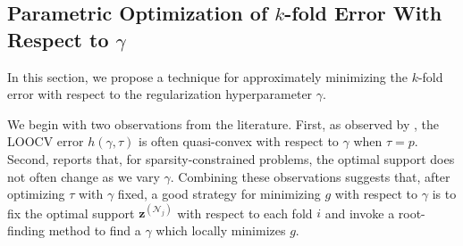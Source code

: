 \documentclass[ijoc,noblindrev]{informs3} %
\let\footnote=\endnote
\begin{document}

\subsection{Parametric Optimization of $k$-fold Error With Respect to $\gamma$} \label{ssec:parametric2}
In this section, we propose a technique for approximately minimizing the $k$-fold error with respect to the regularization hyperparameter $\gamma$. 

We begin with two observations from the literature. First, as observed by \cite{stephenson2021can}, the LOOCV error $h(\gamma,\tau)$ is often quasi-convex with respect to $\gamma$ when $\tau=p$. Second, \cite{bertsimas2021unified, bertsimas2022scalable} reports that, for sparsity-constrained problems, the optimal support does not often change as we vary $\gamma$. Combining these observations suggests that, after optimizing $\tau$ with $\gamma$ fixed, a good strategy for minimizing $g$ with respect to $\gamma$ is to fix the optimal support $\bm{z}^{(\mathcal{N}_j)}$ with respect to each fold $i$ and invoke a root-finding method to find a $\gamma$ which locally minimizes %
$g$.
\end{document}

